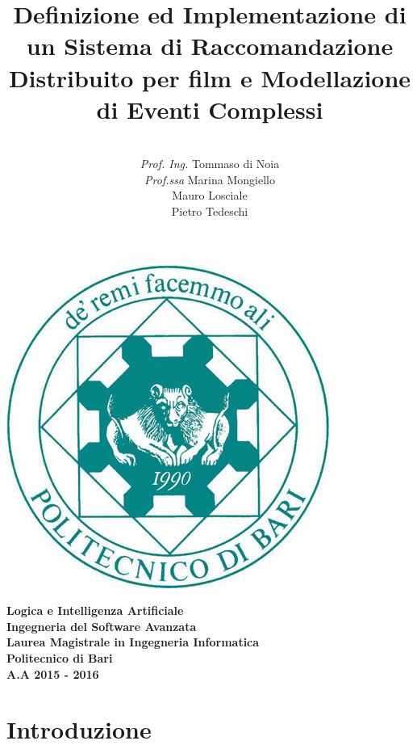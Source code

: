 \documentclass[11pt]{article}
\date{}
\begin{document}
\title{\textbf{Definizione ed Implementazione di un Sistema di Raccomandazione Distribuito per film
		e Modellazione di Eventi Complessi}}

\author{\\\textit{Prof. Ing.} Tommaso di Noia\\\textit{Prof.ssa} Marina Mongiello \\
	Mauro Losciale\\ 
	Pietro Tedeschi\\}

\clearpage\maketitle
\thispagestyle{empty}

\begin{center}
	\includegraphics[scale=0.40]{images/poliba.jpg}
\end{center}

{\textbf{\center Logica e Intelligenza Artificiale\\Ingegneria del Software Avanzata\\ Laurea Magistrale in Ingegneria Informatica\\Politecnico di Bari\\A.A 2015 - 2016\\}}

\newpage
\clearpage
\thispagestyle{empty}
\renewcommand\contentsname{Indice}
\tableofcontents
\newpage
\setcounter{page}{1}

\newpage
\section{Introduzione}
\end{document}
